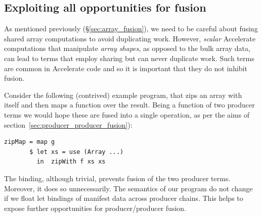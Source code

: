 \subsection{Exploiting all opportunities for fusion}
\label{sec:binder_elimination}


As mentioned previously (\S\ref{sec:array_fusion}), we need to be careful about fusing
shared array computations to avoid duplicating work. However, \emph{scalar}
Accelerate computations that manipulate \emph{array shapes}, as opposed to the
bulk array data, can lead to terms that employ sharing but can never duplicate
work. Such terms are common in Accelerate code and so it is important that they
do not inhibit fusion.

Consider the following (contrived) example program, that zips an array with
itself and then maps a function over the result. Being a function of two
producer terms we would hope these are fused into a single operation, as per the
aims of section~\ref{sec:producer_producer_fusion}):
%
\begin{lstlisting}[style=haskell]
zipMap = map g
       $ let xs = use (Array ...)
         in  zipWith f xs xs
\end{lstlisting}
%
The binding, although trivial, prevents fusion of the two producer terms.
Moreover, it does so unnecessarily. The semantics of our program do not change
if we float let bindings of manifest data across producer chains. This helps to
expose further opportunities for producer/producer fusion.

